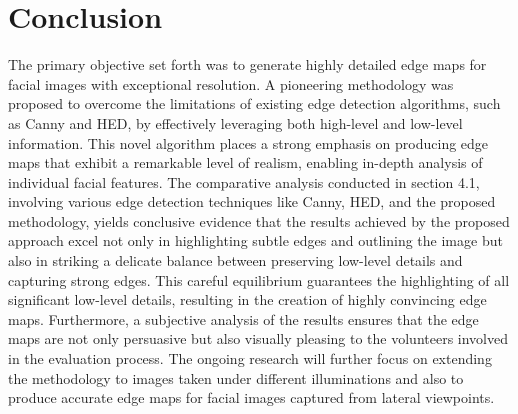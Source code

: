 \documentclass{70_styles/svproc}
\begin{document}
\section{Conclusion}
The primary objective set forth was to generate highly detailed edge maps for facial images with exceptional resolution. A pioneering methodology was proposed to overcome the limitations of existing edge detection algorithms, such as Canny and HED, by effectively leveraging both high-level and low-level information. This novel algorithm places a strong emphasis on producing edge maps that exhibit a remarkable level of realism, enabling in-depth analysis of individual facial features. The comparative analysis conducted in section 4.1, involving various edge detection techniques like Canny, HED, and the proposed methodology, yields conclusive evidence that the results achieved by the proposed approach excel not only in highlighting subtle edges and outlining the image but also in striking a delicate balance between preserving low-level details and capturing strong edges. This careful equilibrium guarantees the highlighting of all significant low-level details, resulting in the creation of highly convincing edge maps. Furthermore, a subjective analysis of the results ensures that the edge maps are not only persuasive but also visually pleasing to the volunteers involved in the evaluation process. The ongoing research will further focus on extending the methodology to images taken under different illuminations and also to produce accurate edge maps for facial images captured from lateral viewpoints.

\printbibliography
\end{document}
